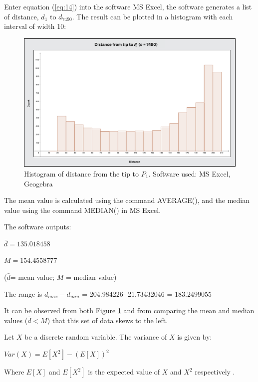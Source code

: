 \documentclass[a4paper,12pt]{article}
\begin{document}
    Enter equation (\ref{eq:14}) into the software MS Excel, the software generates a list of distance, $d_1$ to $d_{7490}$. The result can be plotted in a histogram with each interval of width 10:
    \begin{figure}[H]
        \centering
        \includegraphics[width=\textwidth]{distance-graph}
        \caption{Histogram of distance from the tip to $P_1$. Software used: MS Excel, Geogebra}
        \label{histogram}
    \end{figure}

    The mean value is calculated using the command AVERAGE(), and the median value using the command MEDIAN() in MS Excel.
\pagebreak

    The software outputs:

    \begin{center}
        $\bar d=135.018458$

        $M=154.4558777$
    \end{center}

    ($\bar d$= mean value; $M$ = median value)

    The range is $d_{max} - d_{min}$ = 204.984226- 21.73432046 = 183.2499055

    It can be observed from both Figure \ref{histogram} and from comparing the mean and median values ($\bar d<M$) that this set of data skews to the left. 
    
    Let $X$ be a discrete random variable. The variance of $X$ is given by:

    \begin{center}
        $Var(X)=E[X^2]-(E[X])^2$
    \end{center}

    Where $E[X]$ and $E[X^2]$ is the expected value of $X$ and $X^2$ respectively \cite{nzmaths}. 
\end{document}
